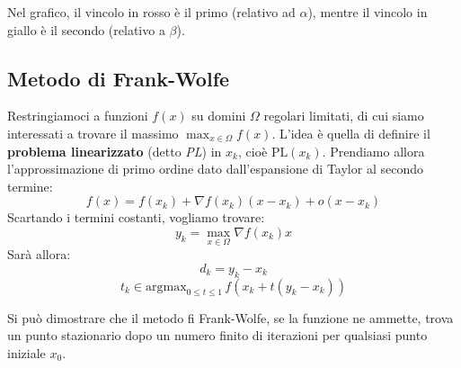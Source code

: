 \documentclass[a4paper,11pt]{article}
\begin{document}
Nel grafico, il vincolo in rosso è il primo (relativo ad $\alpha$), mentre il vincolo in giallo è il secondo (relativo a $\beta$).

\subsection{Metodo di Frank-Wolfe}
Restringiamoci a funzioni $f(x)$ su domini $\Omega$ regolari limitati, di cui siamo interessati a trovare il massimo $\max_{x \in \Omega} f(x)$.
L'idea è quella di definire il \textbf{problema linearizzato} (detto \textit{PL}) in $x_k$, cioè $\mathrm{PL}(x_k)$.
Prendiamo allora l'approssimazione di primo ordine dato dall'espansione di Taylor al secondo termine:
$$
f(x) = f(x_k) + \nabla f(x_k) (x - x_k) + o(x-x_k)
$$
Scartando i termini costanti, vogliamo trovare:
$$
y_k = \max_{x \in \Omega} \nabla f(x_k) x
$$
Sarà allora:
$$
d_k = y_k - x_k
$$
$$
t_k \in \mathrm{argmax}_{0 \leq t \leq 1} \, f(x_k + t(y_k - x_k))
$$

Si può dimostrare che il metodo fi Frank-Wolfe, se la funzione ne ammette, trova un punto stazionario dopo un numero finito di iterazioni per qualsiasi punto iniziale $x_0$. 
\end{document}
